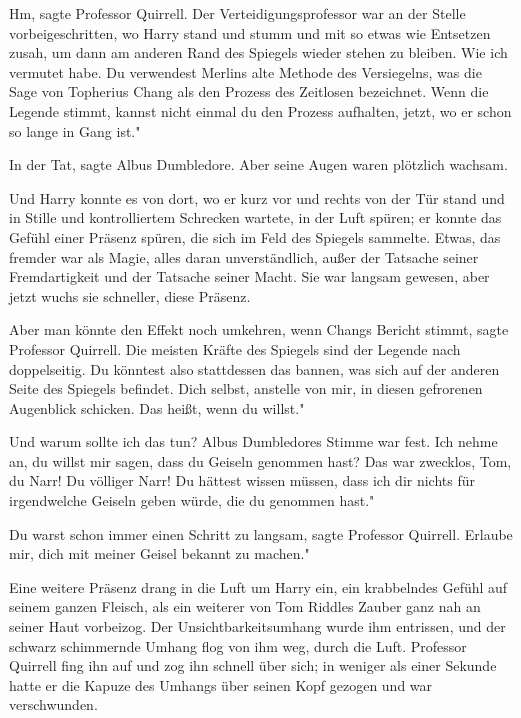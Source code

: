 \glqq{}Hm\grqq{}, sagte Professor Quirrell. Der Verteidigungsprofessor war an der
Stelle vorbeigeschritten, wo Harry stand und stumm und mit so etwas wie
Entsetzen zusah, um dann am anderen Rand des Spiegels wieder stehen zu bleiben.
\glqq{}Wie ich vermutet habe. Du verwendest Merlins alte Methode des Versiegelns,
was die Sage von Topherius Chang als den Prozess des Zeitlosen bezeichnet. Wenn
die Legende stimmt, kannst nicht einmal du den Prozess aufhalten, jetzt, wo er
schon so lange in Gang ist."

\glqq{}In der Tat\grqq{}, sagte Albus Dumbledore. Aber seine Augen waren
plötzlich wachsam.

Und Harry konnte es von dort, wo er kurz vor und rechts von der Tür stand und in
Stille und kontrolliertem Schrecken wartete, in der Luft spüren; er konnte das
Gefühl einer Präsenz spüren, die sich im Feld des Spiegels sammelte. Etwas, das
fremder war als Magie, alles daran unverständlich, außer der Tatsache seiner
Fremdartigkeit und der Tatsache seiner Macht. Sie war langsam gewesen, aber
jetzt wuchs sie schneller, diese Präsenz.

\glqq{}Aber man könnte den Effekt noch umkehren, wenn Changs Bericht
stimmt\grqq{}, sagte Professor Quirrell. \glqq{}Die meisten Kräfte des Spiegels
sind der Legende nach doppelseitig. Du könntest also stattdessen das bannen, was
sich auf der anderen Seite des Spiegels befindet. Dich selbst, anstelle von mir,
in diesen gefrorenen Augenblick schicken. Das heißt, wenn du willst."

\glqq{}Und warum sollte ich das tun?\grqq{} Albus Dumbledores Stimme war fest.
\glqq{}Ich nehme an, du willst mir sagen, dass du Geiseln genommen hast? Das war
zwecklos, Tom, du Narr! Du völliger Narr! Du hättest wissen müssen, dass ich dir
nichts für irgendwelche Geiseln geben würde, die du genommen hast."

\glqq{}Du warst schon immer einen Schritt zu langsam\grqq{}, sagte Professor
Quirrell. \glqq{}Erlaube mir, dich mit meiner Geisel bekannt zu machen."

Eine weitere Präsenz drang in die Luft um Harry ein, ein krabbelndes Gefühl auf
seinem ganzen Fleisch, als ein weiterer von Tom Riddles Zauber ganz nah an
seiner Haut vorbeizog. Der Unsichtbarkeitsumhang wurde ihm entrissen, und der
schwarz schimmernde Umhang flog von ihm weg, durch die Luft. Professor Quirrell
fing ihn auf und zog ihn schnell über sich; in weniger als einer Sekunde hatte
er die Kapuze des Umhangs über seinen Kopf gezogen und war verschwunden.

